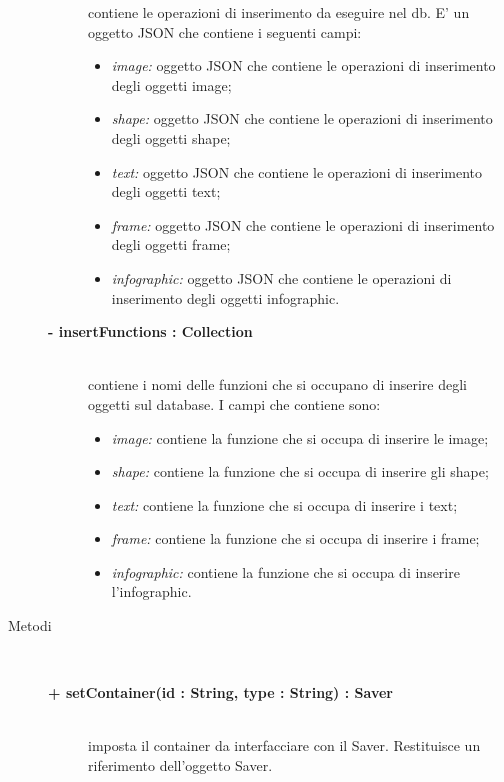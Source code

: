 \begin{description}
\begin{description}
			contiene le operazioni di inserimento da eseguire nel db. E' un oggetto JSON che contiene i seguenti campi:
			\begin{itemize}
				\item \textit{image:} oggetto JSON che contiene le operazioni di inserimento degli oggetti image;
				\item \textit{shape:} oggetto JSON che contiene le operazioni di inserimento degli oggetti shape;
				\item \textit{text:} oggetto JSON che contiene le operazioni di inserimento degli oggetti text;
				\item \textit{frame:} oggetto JSON che contiene le operazioni di inserimento degli oggetti frame;
				\item \textit{infographic:} oggetto JSON che contiene le operazioni di inserimento degli oggetti infographic.
			\end{itemize}
			\item[\textbf{- insertFunctions : Collection			}] \hfill \\
			contiene i nomi delle funzioni che si occupano di inserire degli oggetti sul database. I campi che contiene sono:
			\begin{itemize}
				\item \textit{image:} contiene la funzione che si occupa di inserire le image;
				\item \textit{shape:} contiene la funzione che si occupa di inserire gli shape;
				\item \textit{text:} contiene la funzione che si occupa di inserire i text;
				\item \textit{frame:} contiene la funzione che si occupa di inserire i frame;
				\item \textit{infographic:} contiene la funzione che si occupa di inserire l'infographic.
			\end{itemize}		
		
	\end{description}
	
	
\item[Metodi] \hfill \\

	\begin{description}
		\item[\textbf{\color{blue}+ setContainer(id : String, type : String) : Saver			}] \hfill \\
			imposta il container da interfacciare con il Saver. Restituisce un riferimento dell'oggetto Saver.
			

\end{description}
\end{description}
